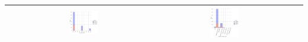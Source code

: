 \begin{table}[!htb]
\begin{center}
\begin{tabular}{ |c|c|c|c| }
			& \includegraphics[width=0.21\textwidth]{NOTEBOOK/IMAGENES_BIRCH_DESCRIPTIVAS/15} 
			& \includegraphics[width=0.21\textwidth]{NOTEBOOK/IMAGENES_BIRCH_DESCRIPTIVAS/16} 
			\\  \hline    
		\end{tabular} 
	\end{center} 
\end{table}

